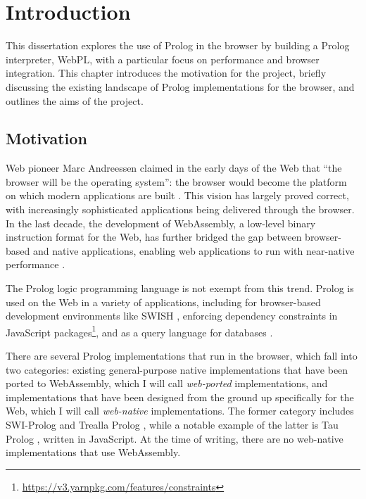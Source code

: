 \chapter{Introduction}

This dissertation explores the use of Prolog in the browser by building a Prolog interpreter, WebPL, with a particular focus on performance and browser integration. This chapter introduces the motivation for the project, briefly discussing the existing landscape of Prolog implementations for the browser, and outlines the aims of the project.

\section{Motivation}

Web pioneer Marc Andreessen claimed in the early days of the Web that ``the browser will be the operating system'': the browser would become the platform on which modern applications are built \cite{kosnerAlwaysEarlyMarc2012}. This vision has largely proved correct, with increasingly sophisticated applications being delivered through the browser. In the last decade, the development of WebAssembly, a low-level binary instruction format for the Web, has further bridged the gap between browser-based and native applications, enabling web applications to run with near-native performance \cite{haasBringingwebspeed2017}.

The Prolog logic programming language is not exempt from this trend. Prolog is used on the Web in a variety of applications, including for browser-based development environments like SWISH \cite{wielemakerSWISHSWIPrologSharing2015}, enforcing dependency constraints in JavaScript packages\footnote{\url{https://v3.yarnpkg.com/features/constraints}}, and as a query language for databases \cite{wielemakerUsingPrologFundament2007}.

There are several Prolog implementations that run in the browser, which fall into two categories: existing general-purpose native implementations that have been ported to WebAssembly, which I will call \emph{web-ported} implementations, and implementations that have been designed from the ground up specifically for the Web, which I will call \emph{web-native} implementations. The former category includes SWI-Prolog \cite{wielemakerSWIProlog2012} and Trealla Prolog \cite{davisonTreallaProlog2020}, while a notable example of the latter is Tau Prolog \cite{riazaTauPrologProlog2024}, written in JavaScript. At the time of writing, there are no web-native implementations that use WebAssembly.

